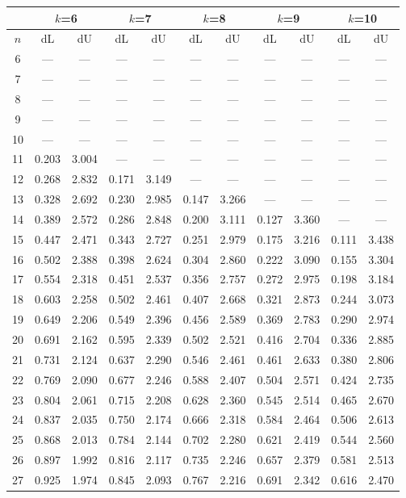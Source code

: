 \documentclass[12pt]{article}
\begin{document}
\begin{table}
\begin{center}
{\scriptsize
\begin{tabular}{|c|c|c|c|c|c|c|c|c|c|c|}
	\hline
	& \multicolumn{2}{c|}{$k$=6}& \multicolumn{2}{c|}{$k$=7} &
	\multicolumn{2}{c|}{$k$=8} & \multicolumn{2}{c|}{$k$=9}&
	\multicolumn{2}{c|}{$k$=10}\\ \hline
	$n$ & dL& dU& dL &dU &dL &dU& dL& dU& dL& dU\\ \hline
	6&---&---&---&---&---&---&---&---&---&---\\
	7&---&---&---&---&---&---&---&---&---&---\\
	8&---&---&---&---&---&---&---&---&---&---\\
	9&---&---&---&---&---&---&---&---&---&---\\
	10&---&---&---&---&---&---&---&---&---&---\\
	11&0.203&3.004&---&---&---&---&---&---&---&---\\
	12&0.268&2.832&0.171&3.149&---&---&---&---&---&---\\
	13&0.328&2.692&0.230&2.985&0.147&3.266&---&---&---&---\\
	14&0.389&2.572&0.286&2.848&0.200&3.111&0.127&3.360&---&---\\
	15&0.447&2.471&0.343&2.727&0.251&2.979&0.175&3.216&0.111&3.438\\
	16&0.502&2.388&0.398&2.624&0.304&2.860&0.222&3.090&0.155&3.304\\
	17&0.554&2.318&0.451&2.537&0.356&2.757&0.272&2.975&0.198&3.184\\
	18&0.603&2.258&0.502&2.461&0.407&2.668&0.321&2.873&0.244&3.073\\
	19&0.649&2.206&0.549&2.396&0.456&2.589&0.369&2.783&0.290&2.974\\
	20&0.691&2.162&0.595&2.339&0.502&2.521&0.416&2.704&0.336&2.885\\
	21&0.731&2.124&0.637&2.290&0.546&2.461&0.461&2.633&0.380&2.806\\
	22&0.769&2.090&0.677&2.246&0.588&2.407&0.504&2.571&0.424&2.735\\
	23&0.804&2.061&0.715&2.208&0.628&2.360&0.545&2.514&0.465&2.670\\
	24&0.837&2.035&0.750&2.174&0.666&2.318&0.584&2.464&0.506&2.613\\
	25&0.868&2.013&0.784&2.144&0.702&2.280&0.621&2.419&0.544&2.560\\
	26&0.897&1.992&0.816&2.117&0.735&2.246&0.657&2.379&0.581&2.513\\
	27&0.925&1.974&0.845&2.093&0.767&2.216&0.691&2.342&0.616&2.470\\

\end{tabular}}
\end{center}
\end{table}
\end{document}
